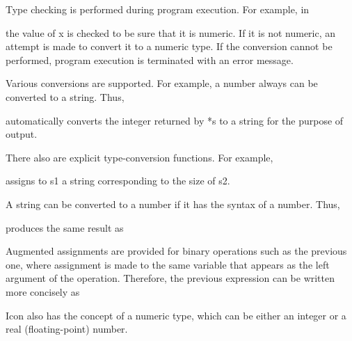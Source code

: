 

Type checking is performed during program execution. For example, in



the value of x is checked to be sure that it is numeric. If it is not
numeric, an attempt is made to convert it to a numeric type. If the
conversion cannot be performed, program execution is terminated with
an error message.

Various conversions are supported. For example, a number always can be
converted to a string. Thus,



\noindent automatically converts the integer returned by *s to a
string for the purpose of output.

There also are explicit type-conversion functions. For example,



\noindent assigns to s1 a string corresponding to the size of s2.

A string can be converted to a number if it has the syntax of a number. Thus,



\noindent produces the same result as


Augmented assignments are provided for binary operations such as the
previous one, where assignment is made to the same variable that
appears as the left argument of the operation. Therefore, the previous
expression can be written more concisely as



Icon also has the concept of a numeric type, which can be either an
integer or a real (floating-point) number.

